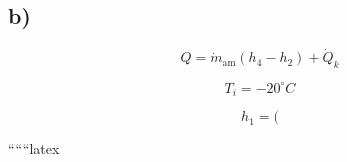 

\subsection*{b)}

\[
Q = \dot{m}_{\text{am}} (h_4 - h_2) + \dot{Q}_k
\]

\[
T_i = -20^\circ C
\]

\[
h_1 = (
\]

``````latex